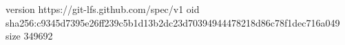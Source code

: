 version https://git-lfs.github.com/spec/v1
oid sha256:c9345d7395e26ff239c5b1d13b2dc23d70394944478218d86c78f1dec716a049
size 349692
